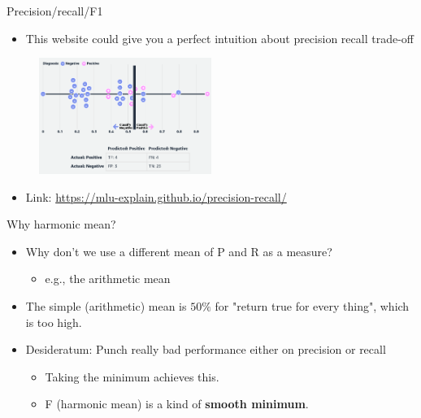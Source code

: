 \documentclass[serif, aspectratio=169]{beamer}
\begin{document}
\begin{frame}{Precision/recall/F1}
    \begin{itemize}
        \item This website could give you a perfect intuition about precision recall trade-off
        
    \end{itemize}
    \begin{figure}[h]
            \centering
            
            \includegraphics[width=0.5\textwidth]{pic/prRtradeoff.png}
            \end{figure}
    \begin{itemize}
        \item Link: \href{https://mlu-explain.github.io/precision-recall/}{https://mlu-explain.github.io/precision-recall/}
    \end{itemize}
\end{frame}
\begin{frame}{Why harmonic mean?}
    \begin{itemize}
        \item Why don't we use a different mean of P and R as a measure?
        \begin{itemize}
            \item e.g., the arithmetic mean
        \end{itemize}
        \item The simple (arithmetic) mean is $50\%$ for "return true for every thing", which is too high.
        \item Desideratum: Punch really bad performance either on precision or recall
        \begin{itemize}
            \item Taking the minimum achieves this.
            \item F (harmonic mean) is a kind of \textbf{smooth minimum}.
        \end{itemize}
    \end{itemize}
\end{frame}
\end{document}
